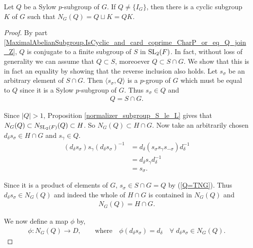 \begin{theorem}
  \label{MaximalAbelianSubgroup.exists_IsCyclic_K_normalizer_eq_Q_join_K}
  Let $Q$ be a Sylow $p$-subgroup of $G$. If $Q \neq \{I_G\}$, then there is a cyclic subgroup $K$ of $G$ such that $N_G(Q) = Q \sqcup K = QK$. \\
\end{theorem}
\begin{proof}
By part \ref{MaximalAbelianSubgroup.IsCyclic_and_card_coprime_CharP_or_eq_Q_join_Z}, $Q$ is conjugate to a finite subgroup of $S$ in $\operatorname{SL}_2(F)$. In fact, without loss of generality we can assume that $Q \subset S$, moreoever $Q \subset S \cap G$. We show that this is in fact an equality by showing that the reverse inclusion also holds. 
Let $s_\sigma$ be an arbitrary element of $S \cap G$. Then $\langle s_\sigma, Q \rangle$ is a $p$-group of $G$ which must be equal to $Q$ since it is a Sylow $p$-subgroup of $G$. Thus $s_\sigma \in Q$ and
\begin{align}\label{Q=TNG} Q = S \cap G.
\end{align}

Since $|Q| > 1$, Proposition \ref{normalizer_subgroup_S_le_L} gives that $N_G(Q) \subset N_{\operatorname{SL}_2(F)}(Q) \subset H$. So $N_G(Q) \subset H \cap G$. Now take an arbitrarily chosen $d_\delta s_\sigma \in H \cap G$ and $s_\gamma \in Q$.
\begin{align*} (d_\delta s_\sigma) s_\gamma (d_\delta s_\sigma)^{-1} &= d_\delta ( s_\sigma s_\gamma  s_{-\sigma}) d^{-1}_\delta
\\ &=  d_\delta s_\gamma d^{-1}_\delta %
\\ &= s_\sigma. %
\end{align*}

Since it is a product of elements of $G$, $s_\sigma \in S \cap G = Q$ by (\ref{Q=TNG}). Thus $d_\delta s_\sigma \in N_G(Q)$ and indeed the whole of $H \cap G$ is contained in $N_G(Q)$ and
\begin{align}\label{normQ=HNG} N_G(Q) = H \cap G.
\end{align}

We now define a map $\phi$ by,
\begin{align*} \phi : N_G(Q) \longrightarrow D, \qquad \text{where} \quad \! \phi(d_\delta s_\sigma) = d_\delta \quad \forall \; d_\delta s_\sigma \in N_G(Q).
\end{align*}


\end{proof}
